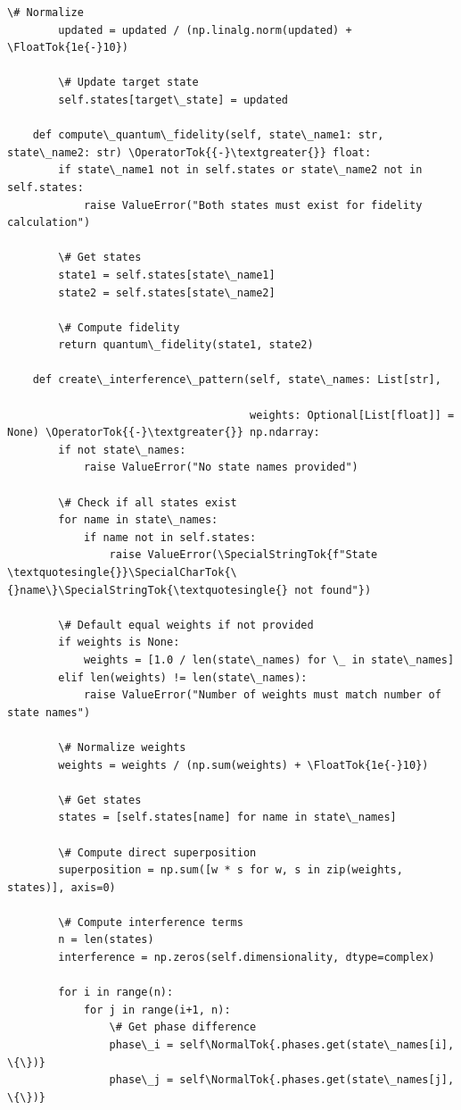 \documentclass[12pt]{article}
\begin{document}
\begin{lstlisting}[basicstyle=\ttfamily\small]
        \# Normalize
        updated = updated / (np.linalg.norm(updated) + \FloatTok{1e{-}10})
        
        \# Update target state
        self.states[target\_state] = updated
    
    def compute\_quantum\_fidelity(self, state\_name1: str, state\_name2: str) \OperatorTok{{-}\textgreater{}} float:
        if state\_name1 not in self.states or state\_name2 not in self.states:
            raise ValueError("Both states must exist for fidelity calculation")
        
        \# Get states
        state1 = self.states[state\_name1]
        state2 = self.states[state\_name2]
        
        \# Compute fidelity
        return quantum\_fidelity(state1, state2)
    
    def create\_interference\_pattern(self, state\_names: List[str],

                                      weights: Optional[List[float]] = None) \OperatorTok{{-}\textgreater{}} np.ndarray:
        if not state\_names:
            raise ValueError("No state names provided")
        
        \# Check if all states exist
        for name in state\_names:
            if name not in self.states:
                raise ValueError(\SpecialStringTok{f"State \textquotesingle{}}\SpecialCharTok{\{}name\}\SpecialStringTok{\textquotesingle{} not found"})
        
        \# Default equal weights if not provided
        if weights is None:
            weights = [1.0 / len(state\_names) for \_ in state\_names]
        elif len(weights) != len(state\_names):
            raise ValueError("Number of weights must match number of state names")
        
        \# Normalize weights
        weights = weights / (np.sum(weights) + \FloatTok{1e{-}10})
        
        \# Get states
        states = [self.states[name] for name in state\_names]
        
        \# Compute direct superposition
        superposition = np.sum([w * s for w, s in zip(weights, states)], axis=0)
        
        \# Compute interference terms
        n = len(states)
        interference = np.zeros(self.dimensionality, dtype=complex)
        
        for i in range(n):
            for j in range(i+1, n):
                \# Get phase difference
                phase\_i = self\NormalTok{.phases.get(state\_names[i], \{\})}
                phase\_j = self\NormalTok{.phases.get(state\_names[j], \{\})}
                

\end{lstlisting}
\end{document}
